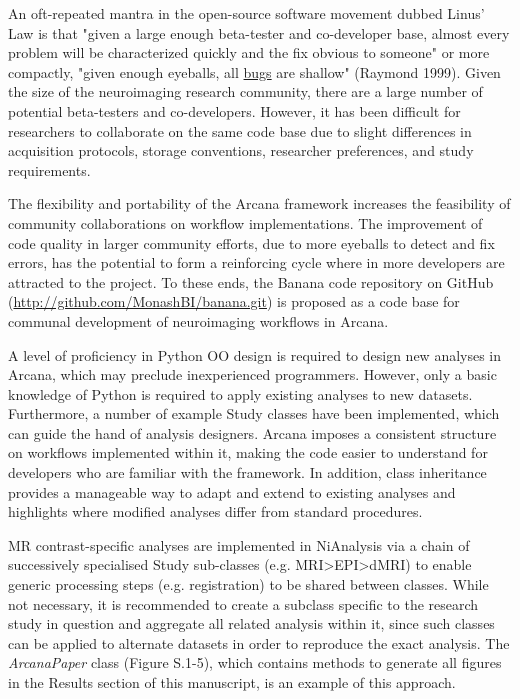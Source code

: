 An oft-repeated mantra in the open-source software movement dubbed
Linus' Law is that "given a large enough beta-tester and co-developer
base, almost every problem will be characterized quickly and the fix
obvious to someone" or more compactly, "given enough eyeballs, all
\href{https://en.wikipedia.org/wiki/Software_bug}{bugs} are shallow"
(Raymond 1999). Given the size of the neuroimaging research community,
there are a large number of potential beta-testers and co-developers.
However, it has been difficult for researchers to collaborate on the
same code base due to slight differences in acquisition protocols,
storage conventions, researcher preferences, and study requirements.

The flexibility and portability of the Arcana framework increases the
feasibility of community collaborations on workflow implementations. The
improvement of code quality in larger community efforts, due to more
eyeballs to detect and fix errors, has the potential to form a
reinforcing cycle where in more developers are attracted to the project.
To these ends, the Banana code repository on GitHub
(\url{http://github.com/MonashBI/banana.git}) is proposed as a code base
for communal development of neuroimaging workflows in Arcana.

A level of proficiency in Python OO design is required to design new
analyses in Arcana, which may preclude inexperienced programmers.
However, only a basic knowledge of Python is required to apply existing
analyses to new datasets. Furthermore, a number of example Study classes
have been implemented, which can guide the hand of analysis designers.
Arcana imposes a consistent structure on workflows implemented within
it, making the code easier to understand for developers who are familiar
with the framework. In addition, class inheritance provides a manageable
way to adapt and extend to existing analyses and highlights where
modified analyses differ from standard procedures.

MR contrast-specific analyses are implemented in NiAnalysis via a chain
of successively specialised Study sub-classes (e.g.
MRI\textgreater{}EPI\textgreater{}dMRI) to enable generic processing
steps (e.g. registration) to be shared between classes. While not
necessary, it is recommended to create a subclass specific to the
research study in question and aggregate all related analysis within it,
since such classes can be applied to alternate datasets in order to
reproduce the exact analysis. The \emph{ArcanaPaper} class (Figure
S.1-5), which contains methods to generate all figures in the Results
section of this manuscript, is an example of this approach.

